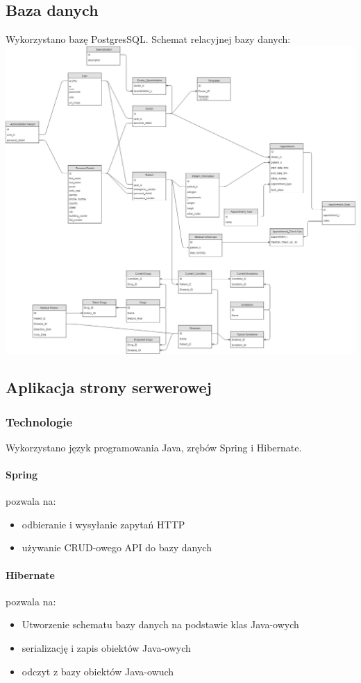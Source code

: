 \documentclass[polish,12pt]{aghthesis}
\begin{document}
\subsection{Baza danych}
Wykorzystano bazę PostgresSQL.
Schemat relacyjnej bazy danych:
\includegraphics[width=\textwidth]{db-schema}

\subsection{Aplikacja strony serwerowej}
\subsubsection{Technologie}
Wykorzystano język programowania Java, zrębów Spring i Hibernate.
\paragraph{Spring} pozwala na:
\begin{itemize}
    \item odbieranie i wysyłanie zapytań HTTP
    \item używanie CRUD-owego API do bazy danych
\end{itemize}
\paragraph{Hibernate} pozwala na:
\begin{itemize}
    \item Utworzenie schematu bazy danych na podstawie klas Java-owych
    \item serializację i zapis obiektów Java-owych
    \item odczyt z bazy obiektów Java-owuch
\end{itemize}
\end{document}
